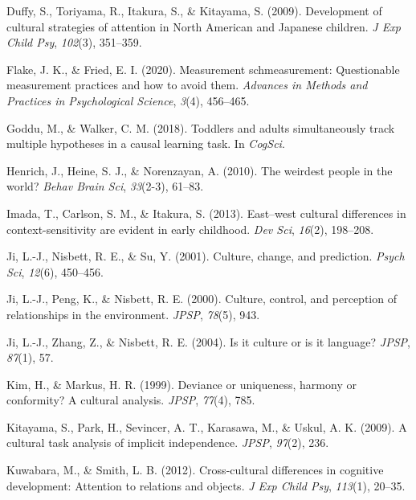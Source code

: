 \documentclass[
  man]{apa6}
\newlength{\cslhangindent}
\newlength{\cslentryspacingunit} %
\newenvironment{CSLReferences}[2] %
 {%
  \setlength{\parindent}{0pt}
  \ifodd #1
  \let\oldpar\par
  \def\par{\hangindent=\cslhangindent\oldpar}
  \fi
  \setlength{\parskip}{#2\cslentryspacingunit}
 }%
 {}
\begin{document}
\begin{CSLReferences}{1}{0}
\leavevmode{}%
Duffy, S., Toriyama, R., Itakura, S., \& Kitayama, S. (2009). Development of cultural strategies of attention in {N}orth {A}merican and {J}apanese children. \emph{J Exp Child Psy}, \emph{102}(3), 351--359.

\leavevmode{}%
Flake, J. K., \& Fried, E. I. (2020). Measurement schmeasurement: Questionable measurement practices and how to avoid them. \emph{Advances in Methods and Practices in Psychological Science}, \emph{3}(4), 456--465.

\leavevmode{}%
Goddu, M., \& Walker, C. M. (2018). Toddlers and adults simultaneously track multiple hypotheses in a causal learning task. In \emph{CogSci}.

\leavevmode{}%
Henrich, J., Heine, S. J., \& Norenzayan, A. (2010). The weirdest people in the world? \emph{Behav Brain Sci}, \emph{33}(2-3), 61--83.

\leavevmode{}%
Imada, T., Carlson, S. M., \& Itakura, S. (2013). East--west cultural differences in context-sensitivity are evident in early childhood. \emph{Dev Sci}, \emph{16}(2), 198--208.

\leavevmode{}%
Ji, L.-J., Nisbett, R. E., \& Su, Y. (2001). Culture, change, and prediction. \emph{Psych Sci}, \emph{12}(6), 450--456.

\leavevmode{}%
Ji, L.-J., Peng, K., \& Nisbett, R. E. (2000). Culture, control, and perception of relationships in the environment. \emph{JPSP}, \emph{78}(5), 943.

\leavevmode{}%
Ji, L.-J., Zhang, Z., \& Nisbett, R. E. (2004). Is it culture or is it language? \emph{JPSP}, \emph{87}(1), 57.

\leavevmode{}%
Kim, H., \& Markus, H. R. (1999). Deviance or uniqueness, harmony or conformity? A cultural analysis. \emph{JPSP}, \emph{77}(4), 785.

\leavevmode{}%
Kitayama, S., Park, H., Sevincer, A. T., Karasawa, M., \& Uskul, A. K. (2009). A cultural task analysis of implicit independence. \emph{JPSP}, \emph{97}(2), 236.

\leavevmode{}%
Kuwabara, M., \& Smith, L. B. (2012). Cross-cultural differences in cognitive development: Attention to relations and objects. \emph{J Exp Child Psy}, \emph{113}(1), 20--35.


\end{CSLReferences}
\end{document}
